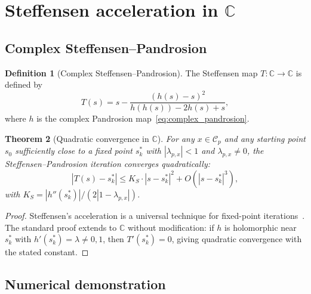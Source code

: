 \documentclass[10pt,a4paper,oneside]{book}
\newtheorem{theorem}{Theorem}[chapter]
\theoremstyle{definition}
\newtheorem{definition}[theorem]{Definition}
\theoremstyle{remark}
\newcommand{\CC}{\mathbb{C}}
\begin{document}
\section{Steffensen acceleration in \texorpdfstring{$\CC$}{C}}
\label{sec:steffensen_complex}

\subsection{Complex Steffensen--Pandrosion}

\begin{definition}[Complex Steffensen--Pandrosion]
The Steffensen map $T : \CC \to \CC$ is defined by
\begin{equation}
  \label{eq:steffensen_complex}
  T(s) = s - \frac{(h(s) - s)^2}{h(h(s)) - 2h(s) + s},
\end{equation}
where $h$ is the complex Pandrosion map~\eqref{eq:complex_pandrosion}.
\end{definition}

\begin{theorem}[Quadratic convergence in $\CC$]
\label{thm:steffensen_complex}
For any $x \in \mathcal{C}_p$ and any starting point $s_0$ sufficiently close to a fixed point $s_k^*$ with $|\lambda_{p,x}| < 1$ and $\lambda_{p,x} \neq 0$, the Steffensen--Pandrosion iteration converges \emph{quadratically}:
\[
  |T(s) - s_k^*| \leq K_S \cdot |s - s_k^*|^2 + O(|s - s_k^*|^3),
\]
with $K_S = |h''(s_k^*)| / (2|1 - \lambda_{p,x}|)$.
\end{theorem}

\begin{proof}
Steffensen's acceleration is a universal technique for fixed-point iterations~\cite{stoer}.  The standard proof extends to $\CC$ without modification: if $h$ is holomorphic near $s_k^*$ with $h'(s_k^*) = \lambda \neq 0, 1$, then $T'(s_k^*) = 0$, giving quadratic convergence with the stated constant.
\end{proof}

\subsection{Numerical demonstration}
\end{document}
